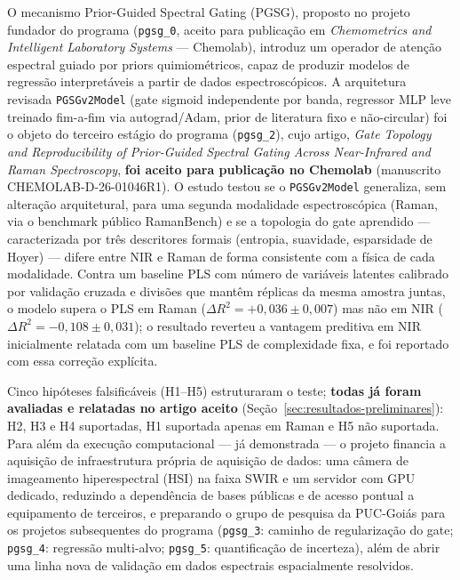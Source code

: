 \documentclass[11pt,a4paper]{article}
\begin{document}
O mecanismo Prior-Guided Spectral Gating (PGSG), proposto no projeto fundador do programa (\texttt{pgsg\_0}, aceito para publicação em \emph{Chemometrics and Intelligent Laboratory Systems} --- Chemolab), introduz um operador de atenção espectral guiado por priors quimiométricos, capaz de produzir modelos de regressão interpretáveis a partir de dados espectroscópicos. A arquitetura revisada \texttt{PGSGv2Model} (gate sigmoid independente por banda, regressor MLP leve treinado fim-a-fim via autograd/Adam, prior de literatura fixo e não-circular) foi o objeto do terceiro estágio do programa (\texttt{pgsg\_2}), cujo artigo, \emph{Gate Topology and Reproducibility of Prior-Guided Spectral Gating Across Near-Infrared and Raman Spectroscopy}, \textbf{foi aceito para publicação no Chemolab} (manuscrito CHEMOLAB-D-26-01046R1). O estudo testou se o \texttt{PGSGv2Model} generaliza, sem alteração arquitetural, para uma segunda modalidade espectroscópica (Raman, via o benchmark público RamanBench) e se a topologia do gate aprendido --- caracterizada por três descritores formais (entropia, suavidade, esparsidade de Hoyer) --- difere entre NIR e Raman de forma consistente com a física de cada modalidade. Contra um baseline PLS com número de variáveis latentes calibrado por validação cruzada e divisões que mantêm réplicas da mesma amostra juntas, o modelo supera o PLS em Raman ($\Delta R^2=+0{,}036\pm0{,}007$) mas não em NIR ($\Delta R^2=-0{,}108\pm0{,}031$); o resultado reverteu a vantagem preditiva em NIR inicialmente relatada com um baseline PLS de complexidade fixa, e foi reportado com essa correção explícita.

Cinco hipóteses falsificáveis (H1--H5) estruturaram o teste; \textbf{todas já foram avaliadas e relatadas no artigo aceito} (Seção~\ref{sec:resultados-preliminares}): H2, H3 e H4 suportadas, H1 suportada apenas em Raman e H5 não suportada. Para além da execução computacional --- já demonstrada --- o projeto financia a aquisição de infraestrutura própria de aquisição de dados: uma câmera de imageamento hiperespectral (HSI) na faixa SWIR e um servidor com GPU dedicado, reduzindo a dependência de bases públicas e de acesso pontual a equipamento de terceiros, e preparando o grupo de pesquisa da PUC-Goiás para os projetos subsequentes do programa (\texttt{pgsg\_3}: caminho de regularização do gate; \texttt{pgsg\_4}: regressão multi-alvo; \texttt{pgsg\_5}: quantificação de incerteza), além de abrir uma linha nova de validação em dados espectrais espacialmente resolvidos.
\end{document}
